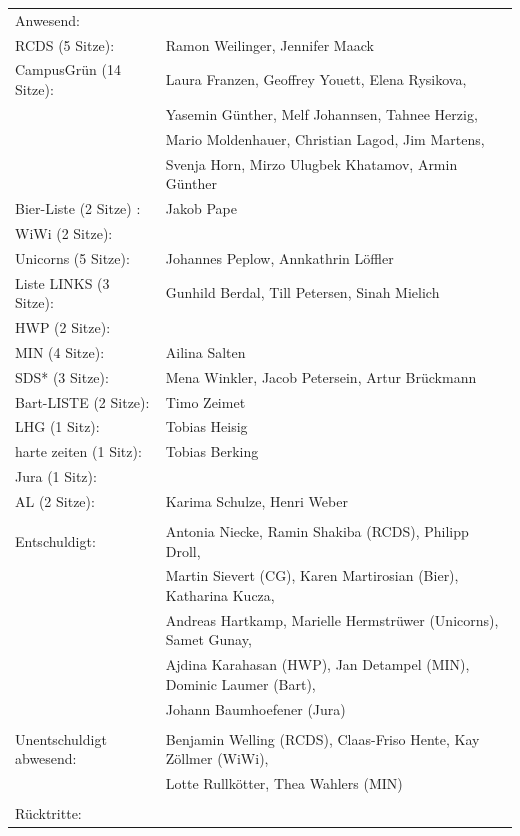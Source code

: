 \documentclass[ngerman,headheight=70pt]{scrartcl}
\begin{document}
    \begin{tabular}{ll}
        Anwesend: & \\
             RCDS (5 Sitze): & Ramon Weilinger, Jennifer Maack \\
             CampusGrün (14 Sitze): & Laura Franzen, Geoffrey Youett, Elena Rysikova, \\
                                   & Yasemin Günther, Melf Johannsen, Tahnee Herzig, \\
                                   & Mario Moldenhauer, Christian Lagod, Jim Martens,\\
                                   & Svenja Horn, Mirzo Ulugbek Khatamov, Armin Günther \\
             Bier-Liste (2 Sitze) : & Jakob Pape \\
             WiWi (2 Sitze): &  \\
             Unicorns (5 Sitze): & Johannes Peplow, Annkathrin Löffler \\
             Liste LINKS (3 Sitze): & Gunhild Berdal, Till Petersen, Sinah Mielich \\
             HWP (2 Sitze): &  \\
             MIN (4 Sitze): & Ailina Salten \\
             SDS* (3 Sitze): & Mena Winkler, Jacob Petersein, Artur Brückmann \\
             Bart-LISTE (2 Sitze): & Timo Zeimet \\
             LHG (1 Sitz):  & Tobias Heisig \\
             harte zeiten (1 Sitz): & Tobias Berking \\
             Jura (1 Sitz): & \\
             AL (2 Sitze): & Karima Schulze, Henri Weber \\
            & \\
        Entschuldigt: & Antonia Niecke, Ramin Shakiba (RCDS), Philipp Droll, \\
                      & Martin Sievert (CG), Karen Martirosian (Bier), Katharina Kucza, \\
                      & Andreas Hartkamp, Marielle Hermstrüwer (Unicorns), Samet Gunay, \\
                      & Ajdina Karahasan (HWP), Jan Detampel (MIN), Dominic Laumer (Bart),\\
                      & Johann Baumhoefener (Jura) \\
                      &\\
        Unentschuldigt abwesend: & Benjamin Welling (RCDS), Claas-Friso Hente, Kay Zöllmer (WiWi), \\
                                 & Lotte Rullkötter, Thea Wahlers (MIN) \\
                                 &\\
        Rücktritte: & \\
    \end{tabular}
\end{document}
